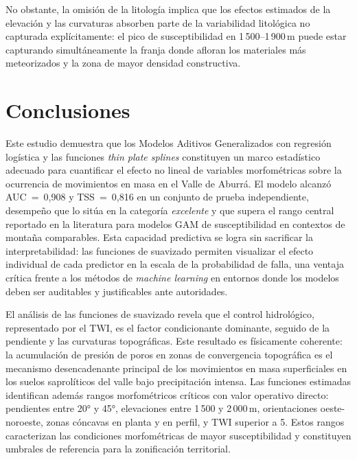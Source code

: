 \documentclass[12pt,a4paper]{article}
\begin{document}
No obstante, la omisión de la litología implica que los efectos
estimados de la elevación y las curvaturas absorben parte de la
variabilidad litológica no capturada explícitamente: el pico de
susceptibilidad en 1\,500--1\,900\,m puede estar capturando
simultáneamente la franja donde afloran los materiales más meteorizados
y la zona de mayor densidad constructiva. 

\section{Conclusiones}

Este estudio demuestra que los Modelos Aditivos Generalizados con
regresión logística y las funciones \textit{thin plate splines} constituyen un marco
estadístico adecuado para cuantificar el efecto no lineal de variables
morfométricas sobre la ocurrencia de movimientos en masa en el Valle de
Aburrá. El modelo alcanzó AUC~=~0{,}908 y TSS~=~0{,}816 en un conjunto
de prueba independiente, desempeño que lo sitúa en la categoría
\textit{excelente} y que supera el rango central reportado en la
literatura para modelos GAM de susceptibilidad en contextos de montaña
comparables. Esta capacidad predictiva se logra sin sacrificar la
interpretabilidad: las funciones de suavizado permiten visualizar el
efecto individual de cada predictor en la escala de la probabilidad de
falla, una ventaja crítica frente a los métodos de \textit{machine
learning} en entornos donde los modelos deben ser auditables y
justificables ante autoridades.

El análisis de las funciones de suavizado revela que el control
hidrológico, representado por el TWI, es el factor condicionante
dominante, seguido de la pendiente y las curvaturas
topográficas. Este resultado es físicamente coherente: la acumulación
de presión de poros en zonas de convergencia topográfica es el
mecanismo desencadenante principal de los movimientos en masa
superficiales en los suelos saprolíticos del valle bajo precipitación
intensa. Las funciones estimadas identifican además rangos morfométricos
críticos con valor operativo directo: pendientes entre 20° y 45°,
elevaciones entre 1\,500 y 2\,000\,m, orientaciones oeste-noroeste,
zonas cóncavas en planta y en perfil, y TWI superior a 5. Estos rangos
caracterizan las condiciones morfométricas de mayor susceptibilidad y
constituyen umbrales de referencia para la zonificación territorial.




\end{document}
